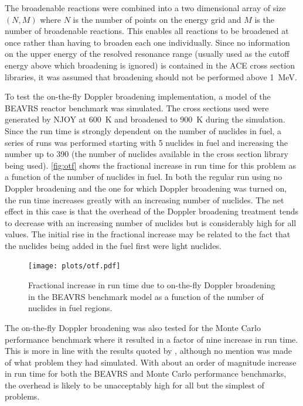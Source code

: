 \documentclass[3p,authoryear]{elsarticle}
\begin{document}
The broadenable reactions were combined into a two dimensional array of size
$(N,M)$ where $N$ is the number of points on the energy grid and $M$ is the
number of broadenable reactions. This enables all reactions to be broadened at
once rather than having to broaden each one individually. Since no information
on the upper energy of the resolved resonance range (usually used as the cutoff
energy above which broadening is ignored) is contained in the ACE cross section
libraries, it was assumed that broadening should not be performed above
\SI{1}{\mega\electronvolt}.

To test the on-the-fly Doppler broadening implementation, a model of the BEAVRS
reactor benchmark was simulated. The cross sections used were generated by NJOY
at \SI{600}{\kelvin} and broadened to \SI{900}{\kelvin} during the
simulation. Since the run time is strongly dependent on the number of nuclides
in fuel, a series of runs was performed starting with 5 nuclides in fuel and
increasing the number up to 390 (the number of nuclides available in the cross
section library being used). \autoref{fig:otf} shows the fractional increase in
run time for this problem as a function of the number of nuclides in fuel. In
both the regular run using no Doppler broadening and the one for which Doppler
broadening was turned on, the run time increases greatly with an increasing
number of nuclides. The net effect in this case is that the overhead of the
Doppler broadening treatment tends to decrease with an increasing number of
nuclides but is considerably high for all values. The initial rise in the
fractional increase may be related to the fact that the nuclides being added in
the fuel first were light nuclides.
\begin{figure}[H]
  \centering
  \texttt{[image: plots/otf.pdf]}
  \caption{Fractional increase in run time due to on-the-fly Doppler broadening
    in the BEAVRS benchmark model as a function of the number of nuclides in
    fuel regions.}
  \label{fig:otf}
\end{figure}

The on-the-fly Doppler broadening was also tested for the Monte Carlo
performance benchmark \citep{mc-hoogenboom-2011} where it resulted in a factor
of nine increase in run time. This is more in line with the results quoted by
\citet{nd-dean-2010}, although no mention was made of what problem they had
simulated. With about an order of magnitude increase in run time for both the
BEAVRS and Monte Carlo performance benchmarks, the overhead is likely to be
unacceptably high for all but the simplest of problems.
\end{document}
